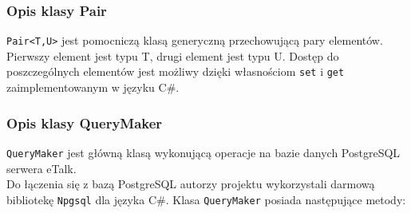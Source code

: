 \documentclass[a4paper,12pt]{article}
\begin{document}
\subsubsection[Opis klasy Pair]{Opis klasy Pair}
\texttt{Pair<T,U>} jest pomocniczą klasą generyczną przechowującą pary elementów.\\
Pierwszy element jest typu T, drugi element jest typu U. Dostęp do poszczególnych elementów jest możliwy dzięki własnościom \texttt{set} i \texttt{get} zaimplementowanym w języku C\#.

\subsubsection[Opis klasy QueryMaker]{Opis klasy QueryMaker}
\texttt{QueryMaker} jest główną klasą wykonującą operacje na bazie danych PostgreSQL serwera eTalk.\\
Do łączenia się z bazą PostgreSQL autorzy projektu wykorzystali darmową bibliotekę \texttt{Npgsql} dla języka C\#.
Klasa \texttt{QueryMaker} posiada następujące metody:
\end{document}

